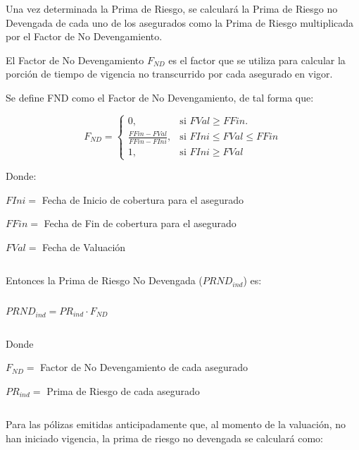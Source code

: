 \documentclass[11pt,twoside,openright,spanish]{report}
\numberwithin{equation}{chapter}
\numberwithin{figure}{chapter}
\numberwithin{table}{chapter}
\begin{document}
	Una vez determinada la Prima de Riesgo, se calculará la Prima de Riesgo no Devengada de cada uno de los asegurados como la Prima de Riesgo multiplicada por el Factor de No Devengamiento.
	
	 
	
	El Factor de No Devengamiento $F_{ND}$ es el factor que se utiliza para calcular la porción de tiempo de vigencia no transcurrido por cada asegurado en vigor.
	
	 
	
	Se define FND como el Factor de No Devengamiento, de tal forma que:
		
		$$
		F_{ND}=\begin{cases}
		0, & \text{si } FVal \geqslant FFin.\\
		\frac{FFin-FVal}{FFin-FIni}, & \text{si } FIni \leqslant FVal \leqslant FFin\\
		1, & \text{si } FIni \geqslant FVal
		\end{cases}
		$$

 
	
	Donde:
	
	 
	
	 $FIni=$ Fecha de Inicio de cobertura para el asegurado
	
	$FFin=$ Fecha de Fin de cobertura para el asegurado
	
	$FVal=$ Fecha de Valuación
	
	
	 

$ $

 
	
	Entonces la Prima de Riesgo No Devengada ($PRND_{ind}$) es:
	
	 

$ $

 
	
		{\centering
		${PRND}_{ind}^{}={{PR}_{ind}\cdot F_{ND}}$
		\noindent
		
	}	
	
	 

$ $

 
	
	Donde
	
	 
	
	 $F_{ND}=$ Factor de No Devengamiento de cada asegurado
	
	$PR_{ind}=$ Prima de Riesgo de cada asegurado 
	
	 

$ $

 
	
	Para las pólizas emitidas anticipadamente que, al momento de la valuación, no han iniciado vigencia, la prima de riesgo no devengada se calculará como:
	
\end{document}
